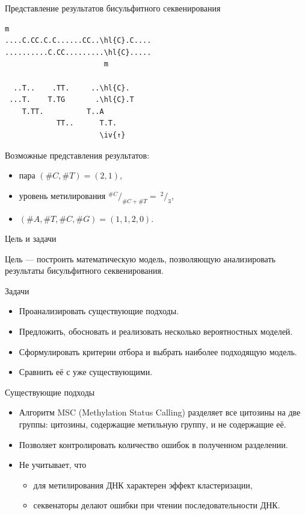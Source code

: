 \documentclass[unicode,mathserif]{beamer}
\newcommand{\hl}[1]{\textcolor{darkred}{#1}}
\newcommand{\iv}[1]{\setlength{\fboxsep}{0pt}\colorbox{darkred}{\strut \textcolor{white}{#1}}}
\begin{document}
\begin{frame}[fragile]{Представление результатов бисульфитного секвенирования}
  \begin{Verbatim}[commandchars=\\\{\}, fontsize=\small]
                      m
....C.CC.C.C......CC..\hl{C}.C....
..........C.CC.........\hl{C}.....
                       m

  ..T..    .TT.     ..\hl{C}.
 ...T.    T.TG       .\hl{C}.T
    T.TT.          T..A
            TT..      T.T.
                      \iv{↑}
\end{Verbatim}
Возможные представления результатов:
\begin{itemize}
\item пара $(\#C, \#T) = (2, 1)$,
\item уровень метилирования $^{\#C}/_{\#C + \#T} =~^2/_3$,
\item $(\#A, \#T, \#C, \#G) = (1, 1, 2, 0)$.
\end{itemize}
\end{frame}


\begin{frame}{Цель и задачи}
  \begin{block}{}
    Цель --- построить математическую модель, позволяющую анализировать
    результаты бисульфитного секвенирования.
  \end{block}

  \begin{block}{Задачи}
    \begin{itemize}
    \item Проанализировать существующие подходы.
    \item Предложить, обосновать и реализовать несколько вероятностных моделей.
    \item Сформулировать критерии отбора и выбрать наиболее подходящую модель.
    \item Сравнить её с уже существующими.
    \end{itemize}
  \end{block}
\end{frame}


\begin{frame}{Существующие подходы}
  \begin{itemize}
  \item Алгоритм MSC (Methylation Status Calling) разделяет все цитозины на две группы:
    цитозины, содержащие метильную группу, и не содержащие её.
  \item Позволяет контролировать количество ошибок в полученном разделении.
  \item Не учитывает, что
    \begin{itemize}
    \item для метилирования ДНК характерен эффект кластеризации,
    \item секвенаторы делают ошибки при чтении последовательности ДНК.
    \end{itemize}
  \end{itemize}
\end{frame}
\end{document}
